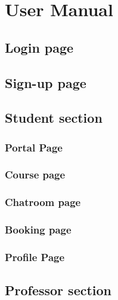 \chapter{User Manual}

\section{Login page}

\newpage

\section{Sign-up page}

\newpage

\section{Student section}

\subsection{Portal Page}

\newpage

\subsection{Course page}

\newpage

\subsection{Chatroom page}

\newpage

\subsection{Booking page}

\newpage

\subsection{Profile Page} 

\newpage

\section{Professor section}

